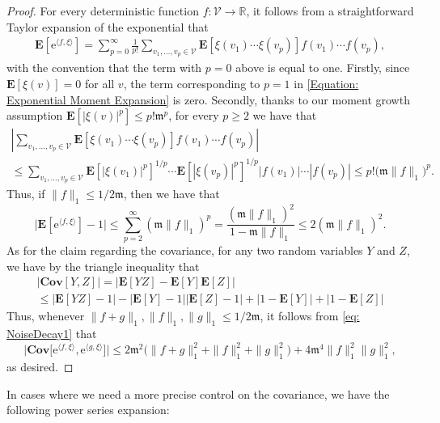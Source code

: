 \documentclass{amsart}
\numberwithin{equation}{section}
\theoremstyle{definition}
\newcommand\mbb{\mathbb}
\newcommand\mbf{\mathbf}
\newcommand\mf{\mathfrak}
\newcommand\mr{\mathrm}
\newcommand\ms{\mathscr}
\begin{document}
\begin{proof}
	For every deterministic function $f:\ms V\to\mbb R$, it follows from
	a straightforward Taylor expansion of the exponential that
	\begin{align}
		\label{Equation: Exponential Moment Expansion}
		\mbf E\left[\mr e^{\langle f,\xi\rangle}\right]=\sum_{p=0}^\infty\frac{1}{p!}\sum_{v_1,\ldots,v_p\in\ms V}\mbf E[\xi(v_1)\cdots\xi(v_p)]f(v_1)\cdots f(v_p),
	\end{align}
	with the convention that the term with $p=0$ above is equal to one.
	Firstly, since $\mbf E[\xi(v)]=0$ for all $v$,
	the term corresponding to $p=1$ in \eqref{Equation: Exponential Moment Expansion} is zero.
	Secondly, thanks to our moment growth assumption $\mbf E[|\xi(v)|^p]\leq p!\mf m^p$, for every $p\geq2$ we have that
	\begin{multline*}
		\left|\sum_{v_1,\ldots,v_p\in\ms V}\mbf E[\xi(v_1)\cdots\xi(v_p)]f(v_1)\cdots f(v_p)\right|\\
		\leq\sum_{v_1,\ldots,v_p\in\ms V}\mbf E[|\xi(v_1)|^p]^{1/p}\cdots\mbf E[|\xi(v_p)|^p]^{1/p}|f(v_1)|\cdots |f(v_p)|
		\leq p!\big(\mf m\|f\|_{1}\big)^p.
	\end{multline*}
	Thus, if $\|f\|_{1}\leq1/2\mf m$, then we have that
	\[\Big|\mbf E\left[\mr e^{\langle f,\xi\rangle}\right]-1\Big|\leq\sum_{p=2}^\infty(\mf m\|f\|_{1})^p=\frac{(\mf m\|f\|_{1})^2}{1-\mf m\|f\|_{1}}\leq2(\mf m\|f\|_{1})^2.\]
	As for the claim regarding the covariance, for any two random variables $Y$ and $Z$,
	we have by the triangle inequality that
	\begin{multline*}
		|\mbf{Cov}[Y,Z]|
		=|\mbf E[YZ]-\mbf E[Y]\mbf E[Z]|\\
		\leq|\mbf E[YZ]-1|-|\mbf E[Y]-1||\mbf E[Z]-1|+|1-\mbf E[Y]|+|1-\mbf E[Z]|
	\end{multline*}
	Thus, whenever $\|f+g\|_{1},\|f\|_{1},\|g\|_{1}\leq1/2\mf m$,
	it follows from \eqref{eq: NoiseDecay1} that
	\[\Big|\mbf{Cov}\big[\mr e^{\langle f,\xi\rangle},\mr e^{\langle g,\xi\rangle}\big]\Big|
	\leq2\mf m^2\big(\|f+g\|_{1}^2+\|f\|_{1}^2+\|g\|^2_{1}\big)+4\mf m^4\|f\|_{1}^2\|g\|_{1}^2,\]
	as desired.
\end{proof}

%

In cases where we need a more precise control on the covariance, we have the following power series expansion:

%
\end{document}
